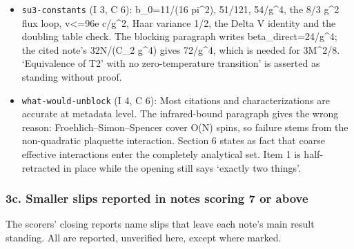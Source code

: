 \documentclass[11pt,a4paper]{article}
\begin{document}
\begin{itemize}
  small-field note's 1e-12.
\item
  \texttt{su3-constants} (I 3, C 6): b\_0=11/(16 pi\^{}2), 51/121,
  54/g\^{}4, the 8/3 g\^{}2 flux loop, v\textless=96e c/g\^{}2, Haar
  variance 1/2, the Delta V identity and the doubling table check. The
  blocking paragraph writes beta\_direct=24/g\^{}4; the cited note's
  32N/(C\_2 g\^{}4) gives 72/g\^{}4, which is needed for 3M\^{}2/8.
  `Equivalence of T2' with no zero-temperature transition' is asserted
  as standing without proof.
\item
  \texttt{what-would-unblock} (I 4, C 6): Most citations and
  characterizations are accurate at metadata level. The infrared-bound
  paragraph gives the wrong reason: Froehlich--Simon--Spencer cover O(N)
  spins, so failure stems from the non-quadratic plaquette interaction.
  Section 6 states as fact that coarse effective interactions enter the
  completely analytical set. Item 1 is half-retracted in place while the
  opening still says `exactly two things'.
\end{itemize}

\hypertarget{c.-smaller-slips-reported-in-notes-scoring-7-or-above}{%
\subsubsection{3c. Smaller slips reported in notes scoring 7 or
above}\label{c.-smaller-slips-reported-in-notes-scoring-7-or-above}}

The scorers' closing reports name slips that leave each note's main
result standing. All are reported, unverified here, except where marked.
\end{document}
